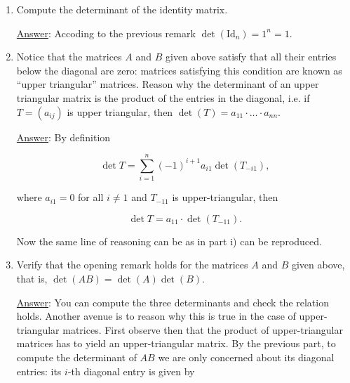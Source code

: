 \documentclass[]{book}
\theoremstyle{definition}
\newcommand\ans{\underline{Answer}: }
\begin{document}
\begin{enumerate}
\begin{enumerate}
\ans The matrix $D = (d_{ij})$ has entries $d_{ii} = \lambda_i$ and $d_{ij} = 0$ for $i\neq j$. The recursive definition of determinant 
we saw in class reads as follows:
\[
\det{D} = \sum_{i=1}^n (-1)^{i+1} d_{i1} \det(D_{-i1}),
\]

where $D_{-i1}$ is the submatrix of $D$ upon removing the $i$-th row and $1$-st column. Since 
$d_{i1} = 0$ for all $i\neq 1$ and $\det(D_{-11}) = \textrm{diag}(\lambda_2,\ldots, \lambda_n)$, 
the previous recurrence simplifies considerably:

\[
\det{D} = \lambda_1 \cdot \det({\textrm{diag}(\lambda_2,\ldots, \lambda_n)}).
\]

Clearly the same argument used to compute the determinant of the smaller diagonal matrix, 
until we reach the base case where we have to compute the determinant of the $1\times 1$ matrix $\left[\lambda_n\right]$.

\item Compute the determinant of the identity matrix.

\ans Accoding to the previous remark $\det(\textrm{Id}_n) = 1^n = 1$.

\item Notice that the matrices $A$ and $B$ given above satisfy that all their entries below the diagonal are zero:
matrices satisfying this condition are known as ``upper triangular'' matrices. Reason why the determinant of an 
upper triangular matrix is the product of the entries in the diagonal, i.e. if $T=(a_{ij})$ is upper triangular, 
then $\det(T) = a_{11}\cdot\ldots\cdot a_{nn}.$

\ans By definition

\[
\det{T} = \sum_{i=1}^n (-1)^{i+1} a_{i1} \det(T_{-i1}),
\]

where $a_{i1} = 0$ for all $i\neq 1$ and $T_{-11}$ is upper-triangular, then

\[
\det{T} = a_{11} \cdot \det(T_{-11}).
\]

Now the same line of reasoning can be as in part i) can be reproduced.

\item Verify that the opening remark holds for the matrices $A$ and $B$ given above, 
that is, $\det(AB)=\det(A)\det(B).$

\ans You can compute the three determinants and check the relation holds. 
Another avenue is to reason why this is true in the case of upper-triangular matrices. 
First observe then that the product of upper-triangular matrices has to yield an upper-triangular matrix. By the previous part, 
to compute the determinant of $AB$ we are only concerned about its diagonal 
entries: its $i$-th diagonal entry is given by 


\end{enumerate}
\end{enumerate}
\end{document}

